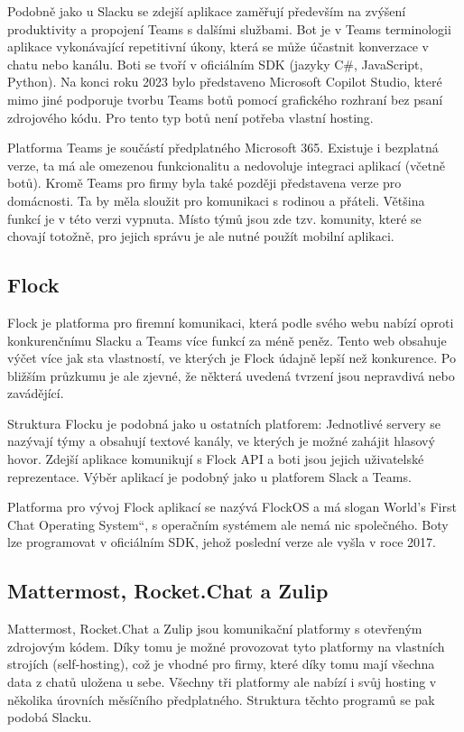 \documentclass[FM]{tulthesis}
\begin{document}
	Podobně jako u Slacku se zdejší aplikace zaměřují především na zvýšení produktivity a propojení Teams s dalšími službami. Bot je v Teams terminologii aplikace vykonávající repetitivní úkony, která se může účastnit konverzace v chatu nebo kanálu. Boti se tvoří v oficiálním SDK (jazyky C\#, JavaScript, Python). Na konci roku 2023 bylo představeno Microsoft Copilot Studio, které mimo jiné podporuje tvorbu Teams botů pomocí grafického rozhraní bez psaní zdrojového kódu. Pro tento typ botů není potřeba vlastní hosting.
	
	Platforma Teams je součástí předplatného Microsoft 365. Existuje i bezplatná verze, ta má ale omezenou funkcionalitu a nedovoluje integraci aplikací (včetně botů). Kromě Teams pro firmy byla také později představena verze pro domácnosti. Ta by měla sloužit pro komunikaci s rodinou a přáteli. Většina funkcí je v této verzi vypnuta. Místo týmů jsou zde tzv. komunity, které se chovají totožně, pro jejich správu je ale nutné použít mobilní aplikaci.
	
	\subsection{Flock}
	
	Flock je platforma pro firemní komunikaci, která podle svého webu nabízí oproti konkurenčnímu Slacku a Teams více funkcí za méně peněz. Tento web obsahuje výčet více jak sta vlastností, ve kterých je Flock údajně lepší než konkurence. Po bližším průzkumu je ale zjevné, že některá uvedená tvrzení jsou nepravdivá nebo zavádějící.
	
	Struktura Flocku je podobná jako u ostatních platforem: Jednotlivé servery se nazývají týmy a obsahují textové kanály, ve kterých je možné zahájit hlasový hovor. Zdejší aplikace komunikují s Flock API a boti jsou jejich uživatelské reprezentace. Výběr aplikací je podobný jako u platforem Slack a Teams.
	
	Platforma pro vývoj Flock aplikací se nazývá FlockOS a má slogan \quotedblbase World's First Chat Operating System\textquotedblleft, s operačním systémem ale nemá nic společného. Boty lze programovat v oficiálním SDK, jehož poslední verze ale vyšla v roce 2017.
	
	\subsection{Mattermost, Rocket.Chat a Zulip}
	
	Mattermost, Rocket.Chat a Zulip jsou komunikační platformy s otevřeným zdrojovým kódem. Díky tomu je možné provozovat tyto platformy na vlastních strojích (self-hosting), což je vhodné pro firmy, které díky tomu mají všechna data z chatů uložena u sebe. Všechny tři platformy ale nabízí i svůj hosting v několika úrovních měsíčního předplatného. Struktura těchto programů se pak podobá Slacku.
	
\end{document}
